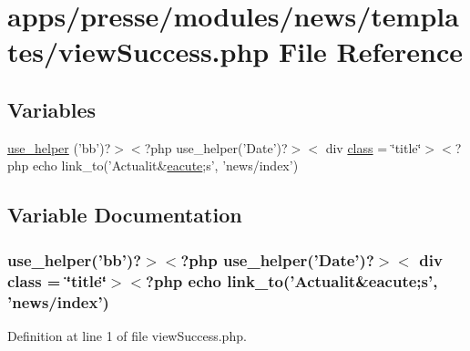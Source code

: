 \hypertarget{presse_2modules_2news_2templates_2view_success_8php}{\section{apps/presse/modules/news/templates/view\-Success.php File Reference}
\label{presse_2modules_2news_2templates_2view_success_8php}
}
\subsection*{Variables}
\begin{DoxyCompactItemize}
\item 
\hyperlink{presse_2modules_2news_2templates_2view_success_8php_a74dbb0c2c09a42cc7f5aa67bd29c2520}{use\-\_\-helper} ('bb')?$>$$<$?php use\-\_\-helper('Date')?$>$$<$ div \hyperlink{live_2modules_2news_2templates_2__actualitelight_8php_a185c73c6507391d1eb38c776b68ce96d}{class} = \char`\"{}title\char`\"{}$>$$<$?php echo link\-\_\-to('Actualit\&\hyperlink{presse_2modules_2page_2templates_2concours_ouikos_success_8php_a5c9a34c76cebfd8ae481fa185a4530af}{eacute};s', 'news/index')
\end{DoxyCompactItemize}


\subsection{Variable Documentation}
\hypertarget{presse_2modules_2news_2templates_2view_success_8php_a74dbb0c2c09a42cc7f5aa67bd29c2520}{
\subsubsection[{use\-\_\-helper}]{\setlength{\rightskip}{0pt plus 5cm}use\-\_\-helper('bb')?$>$$<$?php use\-\_\-helper('Date')?$>$$<$ div {\bf class} = \char`\"{}title\char`\"{}$>$$<$?php echo link\-\_\-to('Actualit\&{\bf eacute};s', 'news/index')}}\label{presse_2modules_2news_2templates_2view_success_8php_a74dbb0c2c09a42cc7f5aa67bd29c2520}


Definition at line 1 of file view\-Success.\-php.

